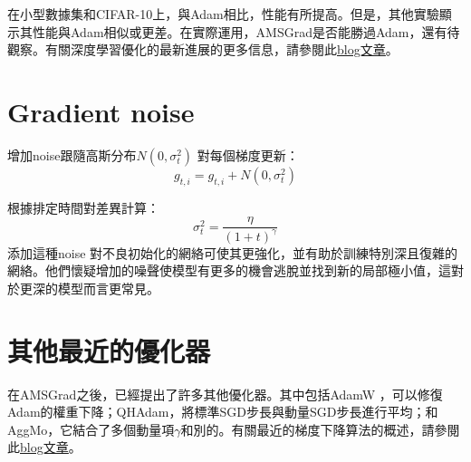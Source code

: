 \documentclass[13pt, a4paper]{report}
\begin{document}
在小型數據集和CIFAR-10上，與Adam相比，性能有所提高。但是，其他實驗顯示其性能與Adam相似或更差。在實際運用，AMSGrad是否能勝過Adam，還有待觀察。有關深度學習優化的最新進展的更多信息，請參閱此\href{https://ruder.io/deep-learning-optimization-2017/}{\underline{blog文章}}。
\section{Gradient noise} 
增加noise跟隨高斯分布$N(0, \sigma^2_t)$ 對每個梯度更新：
$$g_{t, i} = g_{t, i} + N(0, \sigma^2_t)$$

根據排定時間對差異計算：
$$\sigma^2_t = \frac{\eta}{(1 + t)^\gamma}$$
添加這種noise 對不良初始化的網絡可使其更強化，並有助於訓練特別深且復雜的網絡。他們懷疑增加的噪聲使模型有更多的機會逃脫並找到新的局部極小值，這對於更深的模型而言更常見。
\section{其他最近的優化器}
在AMSGrad之後，已經提出了許多其他優化器。其中包括AdamW ，可以修復Adam的權重下降；QHAdam，將標準SGD步長與動量SGD步長進行平均；和AggMo，它結合了多個動量項$\gamma$和別的。有關最近的梯度下降算法的概述，請參閱此\href{https://johnchenresearch.github.io/demon/}{\underline{blog文章}}。
\end{document}
